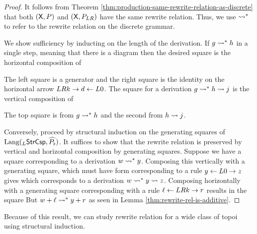\documentclass{amsart}
\begin{document}
\begin{proof}
  It follows from Theorem
  \ref{thm:production-same-rewrite-relation-as-discrete}
  that both $( \mathsf{X},P )$ and $( \mathsf{X},P_{LR} )$ have the same
  rewrite relation.  Thus, we use $\rightsquigarrow^\ast$ to refer to
  the rewrite relation on the discrete grammar.

  We show sufficiency by inducting on the length of the
  derivation. If $ g \rightsquigarrow^\ast h $ in a single step, meaning
  that there is a diagram
   then the desired
  square is the horizontal composition of
    
  The left square is a generator and the right
  square is the identity on the horizontal arrow
  $ LRk \to d \leftarrow L0 $. The square for a
  derivation $ g \rightsquigarrow^\ast h \rightsquigarrow j $ is the
  vertical composition of
    
  The top square is from $ g \rightsquigarrow^\ast h $ and the second
  from $ h \rightsquigarrow j $.

  Conversely, proceed by structural induction on the
  generating squares of
  $ \mathrm{Lang} ( _{L}\mathsf{StrCsp} , \widehat{P_\flat} ) $.  It suffices to
  show that the rewrite relation is preserved by vertical
  and horizontal composition by generating squares.  Suppose
  we have a square 
  corresponding to a derivation $ w \rightsquigarrow^\ast y $. Composing
  this vertically with a generating square, which must have
  form  corresponding
  to a rule $ y \leftarrow L0 \to z $ gives
   which corresponds
  to a derivation $ w \rightsquigarrow^\ast y \rightsquigarrow z $.  Composing
  horizontally with a generating square
   corresponding with
  a rule $ \ell \leftarrow LRk \to r $ results in the square
   But
  $ w+\ell \rightsquigarrow^\ast y+r $ as seen in Lemma
  \ref{thm:rewrite-rel-is-additive}.
\end{proof}

Because of this result, we can study rewrite relation for a
wide class of topoi using structural induction.



\end{document}
